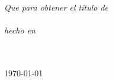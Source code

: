 \documentclass[
12pt, %
spanish, %
singlespacing, %
headsepline, %
]{MastersDoctoralThesis} %
\begin{document}
\begin{titlepage}
\begin{center}
\large \textit{Que para obtener el título de\\ \degreename}\\[0.3cm] %
\textit{hecho en}\\[0.4cm]
\groupname\\\deptname\\[1cm] %
 
\vfill

{\large \today}\\[1cm] %
 
\vfill
\end{center}
\end{titlepage}

\end{document}
